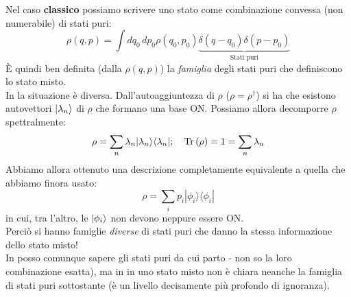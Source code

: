 \documentclass[../../FisicaTeorica.tex]{subfiles}
\begin{document}
Nel caso \textbf{classico} possiamo scrivere uno stato come combinazione convessa (non numerabile) di stati puri:
\[
\rho \left(q,p\right)=\int dq_0\,dp_0 \rho \left(q_0,p_0\right) \underbrace{\delta \left(q-q_0\right)\delta \left(p-p_0\right)}_{\text{Stati puri}}
\]
È quindi ben definita (dalla $\rho(q,p)$) la \textit{famiglia} degli stati puri che definiscono lo stato misto.\\
In \MQ la situazione è diversa. Dall'autoaggiuntezza di $\rho$  ($\rho = \rho^\dag$) si ha che esistono autovettori $\ket{\lambda_n}$ di $\rho$ che formano una base ON. Possiamo allora
decomporre $\rho$ spettralmente:
\[
\rho =\sum_{n}{\lambda_n|\lambda_n\rangle\langle\lambda_n|};\quad \operatorname{Tr}\left(\rho\right)=1= \sum_{n}\lambda_n
\]
Abbiamo allora ottenuto una descrizione completamente equivalente a quella che abbiamo finora usato:
\[
\rho = \sum_{i}{p_i|\phi_i\rangle\langle\phi_i|}
\]
in cui, tra l'altro, le $\ket{\phi_i}$ non devono neppure essere ON.\\
Perciò si hanno famiglie \textit{diverse} di stati puri che danno la stessa informazione dello stato misto!\\
In \MC posso comunque sapere gli stati puri da cui parto - non so la loro combinazione esatta), ma in \MQ in uno stato misto non è chiara neanche la famiglia di stati puri sottostante (è un livello decisamente più profondo di ignoranza).
\end{document}
